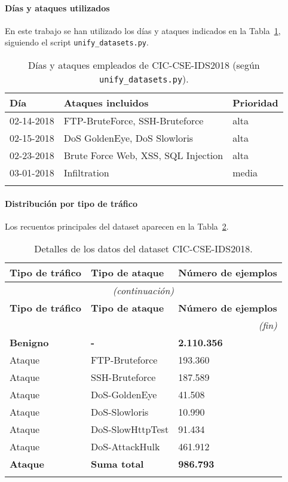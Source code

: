 \paragraph{Días y ataques utilizados}
En este trabajo se han utilizado los días y ataques indicados en la Tabla~\ref{tab:cicids2018-dias}, siguiendo el script \texttt{unify\_datasets.py}.

\begin{longtable}{p{2.8cm}p{8.8cm}p{2cm}}
\textbf{Día} & \textbf{Ataques incluidos} & \textbf{Prioridad} \\
\hline
02-14-2018 & FTP-BruteForce, SSH-Bruteforce & alta \\
02-15-2018 & DoS GoldenEye, DoS Slowloris & alta \\
02-23-2018 & Brute Force Web, XSS, SQL Injection & alta \\
03-01-2018 & Infiltration & media \\
\hline
\caption{Días y ataques empleados de CIC-CSE-IDS2018 (según \texttt{unify\_datasets.py}).}\label{tab:cicids2018-dias}
\end{longtable}

\paragraph{Distribución por tipo de tráfico}
Los recuentos principales del dataset aparecen en la Tabla~\ref{tab:cicids2018-detalles}.

\begin{longtable}{p{3.2cm}p{7.5cm}p{3.2cm}}
\hline
\textbf{Tipo de tráfico} & \textbf{Tipo de ataque} & \textbf{Número de ejemplos} \\
\hline
\endfirsthead
\multicolumn{3}{c}{\small\itshape (continuación)}\\
\hline
\textbf{Tipo de tráfico} & \textbf{Tipo de ataque} & \textbf{Número de ejemplos} \\
\hline
\endhead
\multicolumn{3}{r}{\small\itshape (fin)}\\
\endfoot

\textbf{Benigno} & \textbf{-} & \textbf{2.110.356} \\
Ataque & FTP-Bruteforce & 193.360 \\
Ataque & SSH-Bruteforce & 187.589 \\
Ataque & DoS-GoldenEye & 41.508 \\
Ataque & DoS-Slowloris & 10.990 \\
Ataque & DoS-SlowHttpTest & 91.434 \\
Ataque & DoS-AttackHulk & 461.912 \\
\textbf{Ataque} & \textbf{Suma total} & \textbf{986.793} \\
\caption{Detalles de los datos del dataset CIC-CSE-IDS2018.}
\label{tab:cicids2018-detalles}\\
\end{longtable}

